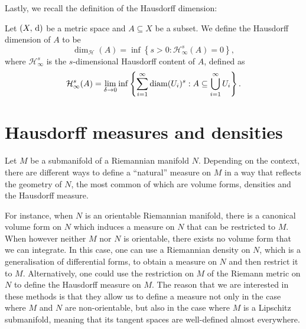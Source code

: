 \documentclass{report}
\begin{document}
Lastly, we recall the definition of the Hausdorff dimension:
\begin{definition}\label{def:hausdorff_dimension}
    Let $(X,\,\mathrm{d})$ be a metric space and $A \subseteq X$ be a subset.
    We define the Hausdorff dimension of $A$ to be
    \[
        \dim_{\mathcal H}(A) = \inf
        \left\{
            s > 0: \mathcal H^s_\infty(A) = 0
        \right\},
    \]
    where $\mathcal H^s_\infty$ is the $s$-dimensional Hausdorff content of $A$, defined as
    \[
        \mathcal H^s_\infty(A) = \lim_{\delta \to 0} \inf
        \left\{
            \sum_{i=1}^\infty \operatorname{diam}(U_i)^s: A \subseteq \bigcup_{i=1}^\infty U_i
        \right\}.
    \]
\end{definition}

\section{Hausdorff measures and densities}\label{sec:measures_and_densities}
Let $M$ be a submanifold of a Riemannian manifold $N$.
Depending on the context, there are different ways to define a ``natural'' measure on $M$ in a way that reflects the geometry of $N$, the most common of which are volume forms, densities and the Hausdorff measure.

For instance, when $N$ is an orientable Riemannian manifold, there is a canonical volume form on $N$ which induces a measure on $N$ that can be restricted to $M$.
When however neither $M$ nor $N$ is orientable, there exists no volume form that we can integrate.
In this case, one can use a Riemannian density on $N$, which is a generalisation of differential forms, to obtain a measure on $N$ and then restrict it to $M$.
Alternatively, one could use the restriction on $M$ of the Riemann metric on $N$ to define the Hausdorff measure on $M$.
The reason that we are interested in these methods is that they allow us to define a measure not only in the case where $M$ and $N$ are non-orientable, but also in the case where $M$ is a Lipschitz submanifold, meaning that its tangent spaces are well-defined almost everywhere.
\end{document}
